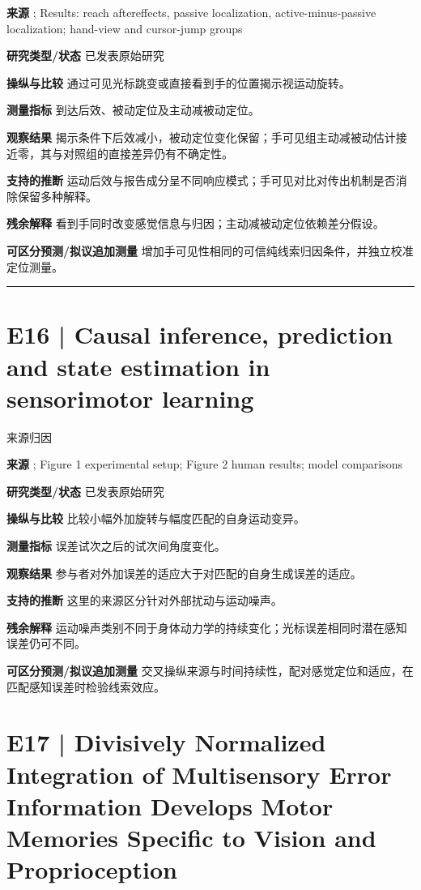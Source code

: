 \documentclass[11pt,a4paper]{article}
\begin{document}
\textbf{来源} \cite{external2020}; Results: reach aftereffects, passive localization, active-minus-passive localization; hand-view and cursor-jump groups\par
\textbf{研究类型/状态} 已发表原始研究\par
\textbf{操纵与比较} 通过可见光标跳变或直接看到手的位置揭示视运动旋转。\par
\textbf{测量指标} 到达后效、被动定位及主动减被动定位。\par
\textbf{观察结果} 揭示条件下后效减小，被动定位变化保留；手可见组主动减被动估计接近零，其与对照组的直接差异仍有不确定性。\par
\textbf{支持的推断} 运动后效与报告成分呈不同响应模式；手可见对比对传出机制是否消除保留多种解释。\par
\textbf{残余解释} 看到手同时改变感觉信息与归因；主动减被动定位依赖差分假设。\par
\textbf{可区分预测/拟议追加测量} 增加手可见性相同的可信纯线索归因条件，并独立校准定位测量。\par
\bigskip\hrule\medskip\section{E16 | Causal inference, prediction and state estimation in sensorimotor learning}
{\small\sffamily\color{navy} 来源归因}\par
\textbf{来源} \cite{piece2025}; Figure 1 experimental setup; Figure 2 human results; model comparisons\par
\textbf{研究类型/状态} 已发表原始研究\par
\textbf{操纵与比较} 比较小幅外加旋转与幅度匹配的自身运动变异。\par
\textbf{测量指标} 误差试次之后的试次间角度变化。\par
\textbf{观察结果} 参与者对外加误差的适应大于对匹配的自身生成误差的适应。\par
\textbf{支持的推断} 这里的来源区分针对外部扰动与运动噪声。\par
\textbf{残余解释} 运动噪声类别不同于身体动力学的持续变化；光标误差相同时潜在感知误差仍可不同。\par
\textbf{可区分预测/拟议追加测量} 交叉操纵来源与时间持续性，配对感觉定位和适应，在匹配感知误差时检验线索效应。\par
\clearpage\section{E17 | Divisively Normalized Integration of Multisensory Error Information Develops Motor Memories Specific to Vision and Proprioception}
\end{document}
